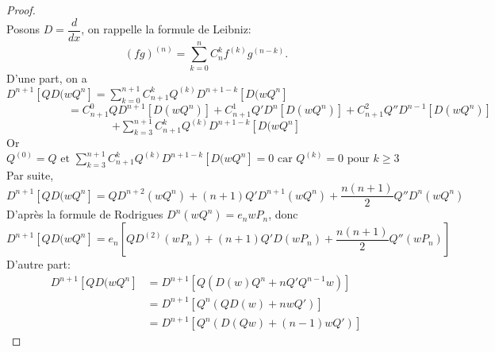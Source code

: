 \begin{proof}
$ $\\
Posons $D=\dfrac{d}{dx}$, on rappelle la formule de Leibniz: $$(fg)^{(n)}=\sum_{k=0}^{n}C^k_n f^{(k)}g^{(n-k)}.$$
D'une part, on a 
\\$\displaystyle{D^{n+1}[QD(wQ^{n}]  =\sum_{k=0}^{n+1} C^k_{n+1}Q^{(k)}D^{n+1-k}[D(wQ^{n}]}$
\\$ \phantom{11111111111}=C^0_{n+1} QD^{n+1}[D(wQ^{n})] + C^1_{n+1}Q'D^{n} [D(wQ^{n})] + C^2_{n+1} Q''D^{n-1}[D(wQ^{n})]$
\\$ \phantom{1111111111111111111}\displaystyle{+ \sum_{k=3}^{n+1}C^k_{n+1} Q^{(k)}D^{n+1-k}[D(wQ^{n}]}$
\\Or $ \displaystyle{Q^{(0)} = Q \text{ et } \sum_{k=3}^{n+1} C^k_{n+1} Q^{(k)} D^{n+1-k}[D(wQ^{n}]=0 \text{ car } Q^{(k)}=0 \text{ pour } k \geqslant 3 }$
\\Par suite, $D^{n+1}[QD(wQ^{n}]= QD^{n+2}(wQ^{n})+(n+1)Q'D^{n+1}(wQ^{n})+\dfrac{n(n+1)}{2}Q''D^{n}(wQ^{n})$
\\$ $\\D'après la formule de Rodrigues $D^{n}(wQ^{n})=e_{n}wP_{n}$, donc
\\$D^{n+1}[QD(wQ^{n}]= e_{n}\left[QD^{(2)}(wP_{n})+(n+1)Q'D(wP_{n})+\dfrac{n(n+1)}{2}Q''(wP_{n})\right]$
\\$ $\\D'autre part:
\begin{align*}
D^{n+1}[QD(wQ^{n}] & = D^{n+1}[Q(D(w)Q^{n}+nQ'Q^{n-1}w)]\\
& = D^{n+1}[Q^{n}(QD(w)+nwQ')]\\
& = D^{n+1}[Q^{n}(D(Qw)+(n-1)wQ')]
\end{align*}


\end{proof}
